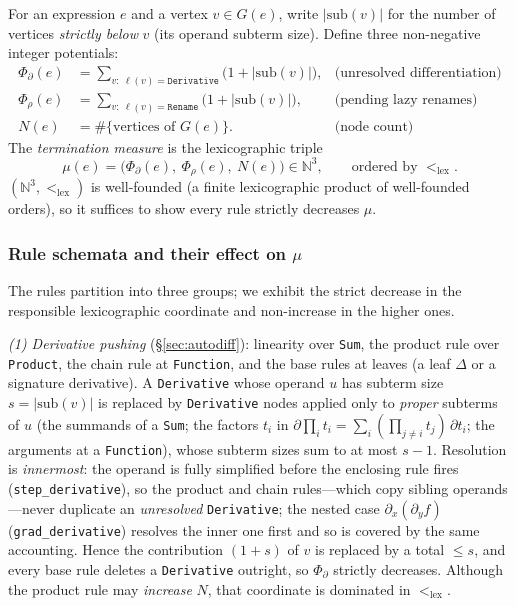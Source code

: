 \documentclass[sigplan,10pt,review]{acmart}
\begin{document}
For an expression $e$ and a vertex $v\in G(e)$, write $\lvert
\mathrm{sub}(v)\rvert$ for the number of vertices \emph{strictly below}
$v$ (its operand subterm size). Define three non-negative integer
potentials:
\begin{align*}
\Phi_\partial(e) &= \!\!\sum_{v:\ \ell(v)=\texttt{Derivative}}\!\!
   \big(1+\lvert\mathrm{sub}(v)\rvert\big),
   &\text{(unresolved differentiation)}\\
\Phi_\rho(e) &= \!\!\sum_{v:\ \ell(v)=\texttt{Rename}}\!\!
   \big(1+\lvert\mathrm{sub}(v)\rvert\big),
   &\text{(pending lazy renames)}\\
N(e) &= \#\{\text{vertices of } G(e)\}.
   &\text{(node count)}
\end{align*}
The \emph{termination measure} is the lexicographic triple
\[
  \mu(e)=\big(\Phi_\partial(e),\ \Phi_\rho(e),\ N(e)\big)\in\mathbb{N}^3,
  \qquad \text{ordered by } <_{\mathrm{lex}}.
\]
$(\mathbb{N}^3,<_{\mathrm{lex}})$ is well-founded (a finite lexicographic
product of well-founded orders), so it suffices to show every rule
strictly decreases $\mu$.

\subsubsection*{Rule schemata and their effect on $\mu$}

The rules partition into three groups; we exhibit the strict decrease in
the responsible lexicographic coordinate and non-increase in the higher
ones.

\emph{(1) Derivative pushing} (\S\ref{sec:autodiff}): linearity over
\texttt{Sum}, the product rule over \texttt{Product}, the chain rule at
\texttt{Function}, and the base rules at leaves (a leaf $\Delta$ or a
signature derivative). A \texttt{Derivative} whose operand $u$ has
subterm size $s=\lvert\mathrm{sub}(v)\rvert$ is replaced by
\texttt{Derivative} nodes applied only to \emph{proper} subterms of $u$
(the summands of a \texttt{Sum}; the factors $t_i$ in
$\partial\prod_i t_i=\sum_i(\prod_{j\ne i}t_j)\,\partial t_i$; the
arguments at a \texttt{Function}), whose subterm sizes sum to at most
$s-1$. Resolution is \emph{innermost}: the operand is fully simplified
before the enclosing rule fires (\texttt{step\_derivative}), so the
product and chain rules---which copy sibling operands---never duplicate
an \emph{unresolved} \texttt{Derivative}; the nested case
$\partial_x(\partial_y f)$ (\texttt{grad\_derivative}) resolves the
inner one first and so is covered by the same accounting. Hence the
contribution $(1+s)$ of $v$ is replaced by a total $\le s$, and every
base rule deletes a \texttt{Derivative} outright, so $\Phi_\partial$
strictly decreases. Although the product rule may \emph{increase} $N$,
that coordinate is dominated in $<_{\mathrm{lex}}$.
\end{document}
